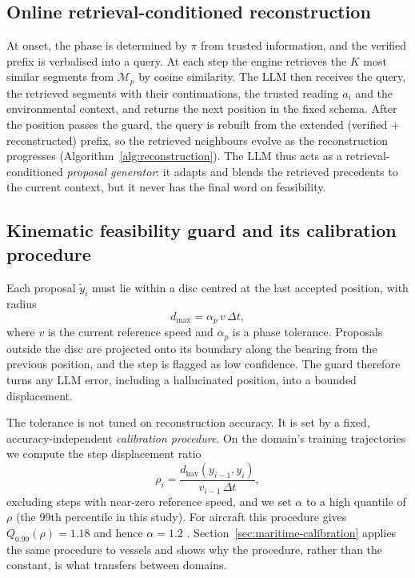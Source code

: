 \subsection{Online retrieval-conditioned reconstruction}

At onset, the phase is determined by $\pi$ from trusted information, and the
verified prefix is verbalised into a query. At each step the engine
retrieves the $K$ most similar segments from $\mathcal{M}_p$ by cosine
similarity. The LLM then receives the query, the retrieved segments with
their continuations, the trusted reading $a_i$ and the environmental
context, and returns the next position in the fixed schema. After the
position passes the guard, the query is rebuilt from the extended (verified
+ reconstructed) prefix, so the retrieved neighbours evolve as the
reconstruction progresses (Algorithm~\ref{alg:reconstruction}). The LLM thus
acts as a retrieval-conditioned \emph{proposal generator}: it adapts and
blends the retrieved precedents to the current context, but it never has the
final word on feasibility.

\subsection{Kinematic feasibility guard and its calibration procedure}
\label{sec:calibration}

Each proposal $\tilde{y}_i$ must lie within a disc centred at the last
accepted position, with radius
\begin{equation}
d_{\max} = \alpha_p \, v \, \Delta t,
\label{eq:guard}
\end{equation}
where $v$ is the current reference speed and $\alpha_p$ is a phase
tolerance. Proposals outside the disc are projected onto its boundary along
the bearing from the previous position, and the step is flagged as low
confidence. The guard therefore turns any LLM error, including a
hallucinated position, into a bounded displacement.

The tolerance is not tuned on reconstruction accuracy. It is set by a fixed,
accuracy-independent \emph{calibration procedure}. On the domain's training
trajectories we compute the step displacement ratio
\begin{equation}
\rho_i = \frac{d_{\mathrm{hav}}(y_{i-1}, y_i)}{v_{i-1} \, \Delta t},
\label{eq:rho}
\end{equation}
excluding steps with near-zero reference speed, and we set $\alpha$ to a
high quantile of $\rho$ (the 99th percentile in this study). For aircraft
this procedure gives $Q_{0.99}(\rho) = 1.18$ and hence $\alpha = 1.2$
\citep{felendler2026trajrag}. Section~\ref{sec:maritime-calibration} applies
the same procedure to vessels and shows why the procedure, rather than the
constant, is what transfers between domains.

